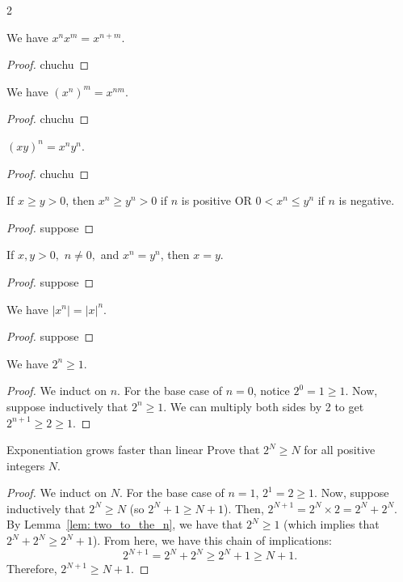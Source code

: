 \begin{multicols}{2}
\begin{proposition} We have $x^n x^m = x^{n + m}$.
\end{proposition}
\begin{proof}
    chuchu
\end{proof}

\begin{proposition} We have $(x^n)^m=x^{nm}.$
\end{proposition}
\begin{proof}
    chuchu
\end{proof}

\begin{proposition} $(xy)^n=x^n y^n.$
\end{proposition}
\begin{proof}
    chuchu
\end{proof}

\begin{proposition}
    If $x \geq y > 0$, then $x^n \geq y^n > 0$ if $n$ is positive OR $0 < x^n \leq y^n$ if $n$ is negative.
\end{proposition}
\begin{proof}
    suppose
\end{proof}

\begin{proposition}
    If $x, y > 0,$ $n \neq 0,$ and $x^n = y^n$, then $x = y$.
\end{proposition}
\begin{proof}
    suppose
\end{proof}

\begin{proposition}
    We have $\lvert x^n \rvert = \lvert x \rvert ^n$.
\end{proposition}
\begin{proof}
    suppose
\end{proof}
\end{multicols}

\begin{lemma}\label{lem: two_to_the_n}
    We have $2^n \geq 1.$
\end{lemma}
\begin{proof}
    We induct on $n$. For the base case of $n = 0$, notice $2^0 = 1 \geq 1.$
    Now, suppose inductively that $2^n \geq 1.$ We can multiply both sides by 2 to get $2^{n+1} \geq 2 \geq 1.$
\end{proof}

\begin{problem}{Exponentiation grows faster than linear}
    Prove that $2^N \geq N$ for all positive integers $N$.
\end{problem}
\begin{proof}
    We induct on $N$. 
    For the base case of $n = 1$, $2^1 = 2 \geq 1.$
    Now, suppose inductively that $2^N \geq N$ (so $2^N + 1 \geq N + 1$).
    Then, $2^{N + 1} = 2^N \times 2 = 2^N + 2^N.$
    By Lemma~\ref{lem: two_to_the_n}, we have that $2^N \geq 1$ (which implies that $2^N + 2^N \geq 2^N + 1$).
    From here, we have this chain of implications:
    $$2^{N+1} = 2^N + 2^N \geq 2^N + 1 \geq N + 1.$$  Therefore, $2^{N+1} \geq N + 1.$
\end{proof}